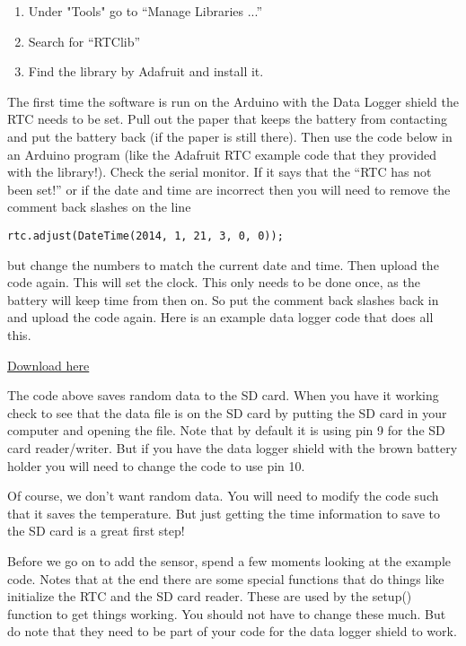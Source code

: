 	\begin{enumerate}
		\item Under "Tools" go to ``Manage Libraries ...''
		\item Search for ``RTClib''
		\item Find the library by Adafruit and install it.
	\end{enumerate}

    The first time the software is run on the Arduino with the Data Logger shield the RTC needs to be set.  Pull out the paper that keeps the battery from contacting  and put the battery back (if the paper is still there). Then use the code below in an Arduino program (like the Adafruit RTC example code that they provided with the library!). Check the serial monitor. If it says that the ``RTC has not been set!'' or if the date and time are incorrect then you will need to remove the comment back slashes on the line 
    
    \begin{lstlisting}[language=Arduino]
   		 rtc.adjust(DateTime(2014, 1, 21, 3, 0, 0));
    \end{lstlisting}
    
    \noindent but change the numbers to match the current date and time. Then upload the code again. This will set the clock. This only needs to be done once, as the battery will keep time from then on. So put the comment back slashes back in and upload the code again. Here is an example data logger code that does all this.

\href{https://raw.githubusercontent.com/rtlines/IntermediateLabPH250/main/Code/DataLog.ino}{Download here}
    


The code above saves random data to the SD card. When you have it working check to see that the data file is on the SD card by putting the SD card in your computer and opening the file.  Note that by default it is using pin 9 for the SD card reader/writer. But if you have the data logger shield with the brown battery holder you will need to change the code to use pin 10.

Of course, we don't want random data. You will need to modify the code such that it saves the temperature. But just getting the time information to save to the SD card is a great first step!

Before we go on to add the sensor, spend a few moments looking at the example code.  Notes that at the end there are some special functions that do things like initialize the RTC and the SD card reader.  These are used by the setup() function to get things working. You should not have to change these much.  But do note that they need to be part of your code for the data logger shield to work.

